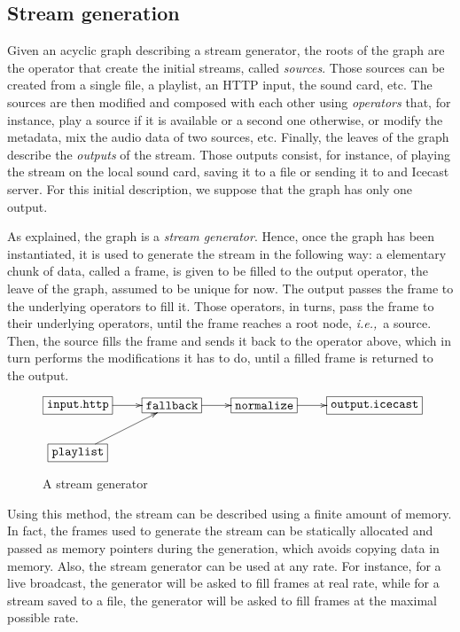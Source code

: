 \documentclass{llncs}
\newcommand{\ie}{{\em i.e.,}}
\begin{document}
\subsection*{Stream generation}

Given an acyclic graph describing a stream generator, the roots of the graph are the operator that create 
the initial streams, called \textit{sources}. Those sources can be created from a single file, a playlist, an HTTP input,
the sound card, etc. The sources are then modified and composed with each other using 
\textit{operators} that, for instance, play a source if it is available or a second one otherwise, or modify
the metadata, mix the audio data of two sources, etc.
Finally, the leaves of the graph describe the \textit{outputs} of the stream. Those outputs consist, for instance,
of playing the stream on the local sound card, saving it to a file or sending it to and Icecast server. 
For this initial description, we suppose that the graph has only one output.

As explained, the graph is a \textit{stream generator}. Hence, once the graph has been instantiated,
it is used to generate the stream in the following way: a elementary chunk of data, called a frame, is given to be filled to the 
output operator, the leave of the graph, assumed to be unique for now. 
The output passes the frame to the underlying operators to fill it. Those operators, in turns, pass the frame to their 
underlying operators, until the frame reaches a root node, \ie\ a source. 
Then, the source fills the frame and sends it back to the operator above, which in turn performs
the modifications it has to do, until a filled frame is returned to the output.

\begin{figure}[htn]
 \begin{center}
\[
\xymatrix{
  *+[F]{\mathtt{input.http}}\ar[r]&*+[F]{\mathtt{fallback}}\ar[r]&
  *+[F]{\mathtt{normalize}}\ar[r]&
  *+[F]{\mathtt{output.icecast}}\\
  *+[F]{\mathtt{playlist}}\ar[ur]&\\
}
\]
\end{center}
 \caption{A stream generator}
\end{figure}

Using this method, the stream can be described using a finite amount of memory. In fact, the frames used
to generate the stream can be statically allocated and passed as memory pointers during the generation, which 
avoids copying data in memory. Also, the stream generator can be used at any rate. For instance,
for a live broadcast, the generator will be asked to fill frames at real rate, while 
for a stream saved to a file, the generator will be asked to fill frames at the maximal possible rate.
\end{document}
